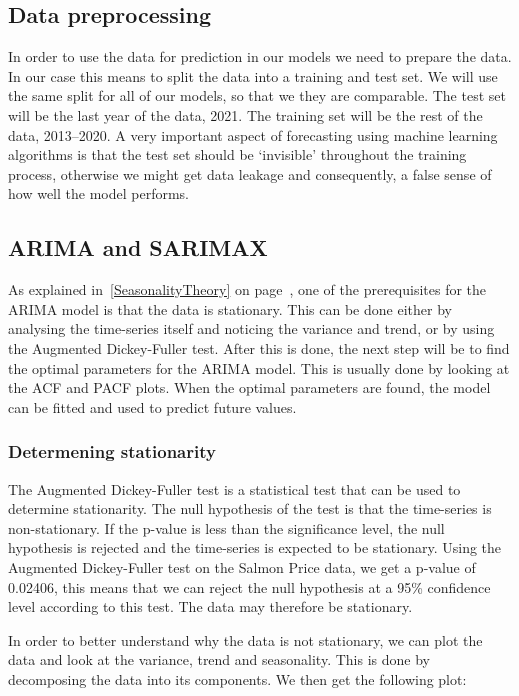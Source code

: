 \subsection{Data preprocessing}
In order to use the data for prediction in our models we need to prepare the data. In our case this means to split the data into a training and test set. We will use the same split for all of our models, so that we they are comparable. The test set will be the last year of the data, 2021. The training set will be the rest of the data, 2013--2020. A very important aspect of forecasting using machine learning algorithms is that the test set should be `invisible' throughout the training process, otherwise we might get data leakage and consequently, a false sense of how well the model performs.~\parencite{brownlee_2016}
\subsection{ARIMA and SARIMAX}

As explained in~\ref{SeasonalityTheory} on page~\pageref{SeasonalityTheory}, one of the prerequisites for the ARIMA model is that the data is stationary. This can be done either by analysing the time-series itself and noticing the variance and trend, or by using the Augmented Dickey-Fuller test. 
After this is done, the next step will be to find the optimal parameters for the ARIMA model. This is usually done by looking at the ACF and PACF plots. 
When the optimal parameters are found, the model can be fitted and used to predict future values. \parencite{hyndman_athanasopoulos_2021}

\subsubsection{Determening stationarity}\label{DeterminingStationarity}
The Augmented Dickey-Fuller test is a statistical test that can be used to determine stationarity. The null hypothesis of the test is that the time-series is non-stationary. If the p-value is less than the significance level, the null hypothesis is rejected and the time-series is expected to be stationary.
Using the Augmented Dickey-Fuller test on the Salmon Price data, we get a p-value of 0.02406, this means that we can reject the null hypothesis at a 95\% confidence level according to this test. The data may therefore be stationary.~\parencite{Dickey_Fuller1979}

In order to better understand why the data is not stationary, we can plot the data and look at the variance, trend and seasonality. This is done by decomposing the data into its components. We then get the following plot: 

